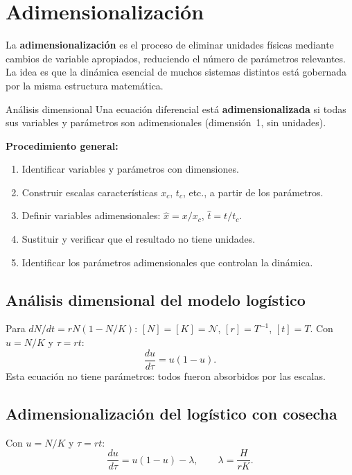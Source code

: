\documentclass[11pt,letterpaper]{article}
\begin{document}
\section{Adimensionalización}
\label{sec:adimensionalizacion}

La \textbf{adimensionalización} es el proceso de eliminar unidades físicas
mediante cambios de variable apropiados, reduciendo el número de parámetros
relevantes. La idea es que la dinámica esencial de muchos sistemas distintos
está gobernada por la misma estructura matemática.

\begin{definicion}{Análisis dimensional}{}
Una ecuación diferencial está \textbf{adimensionalizada} si todas sus variables
y parámetros son adimensionales (dimensión~1, sin unidades).
\end{definicion}

\textbf{Procedimiento general:}
\begin{enumerate}
    \item Identificar variables y parámetros con dimensiones.
    \item Construir escalas características $x_c$, $t_c$, etc., a partir de los parámetros.
    \item Definir variables adimensionales: $\hat{x}=x/x_c$, $\hat{t}=t/t_c$.
    \item Sustituir y verificar que el resultado no tiene unidades.
    \item Identificar los parámetros adimensionales que controlan la dinámica.
\end{enumerate}

\subsection{Análisis dimensional del modelo logístico}

Para $dN/dt=rN(1-N/K)$: $[N]=[K]=\mathcal{N}$, $[r]=T^{-1}$, $[t]=T$.
Con $u=N/K$ y $\tau=rt$:
\[
\frac{du}{d\tau}=u(1-u).
\]
Esta ecuación no tiene parámetros: todos fueron absorbidos por las escalas.

\subsection{Adimensionalización del logístico con cosecha}

Con $u=N/K$ y $\tau=rt$:
\[
\frac{du}{d\tau}=u(1-u)-\lambda,\qquad \lambda=\frac{H}{rK}.
\]
\end{document}
